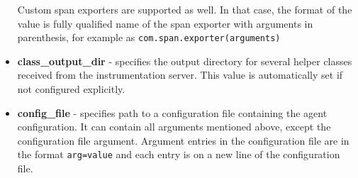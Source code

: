 \documentclass[12pt,a4paper]{report}
\begin{document}
\begin{itemize}
	Custom span exporters are supported as well. In that case, the format of the value is fully qualified name of the span exporter with arguments in parenthesis, for example as \texttt{com.span.exporter(arguments)}
	\item \textbf{class\_output\_dir} - specifies the output directory for several helper classes received from the instrumentation server. This value is automatically set if not configured explicitly.
	\item \textbf{config\_file} - specifies path to a configuration file containing the agent configuration. It can contain all arguments mentioned above, except the configuration file argument. Argument entries in the configuration file are in the format \texttt{arg=value} and each entry is on a new line of the configuration file. 
\end{itemize}
\end{document}
